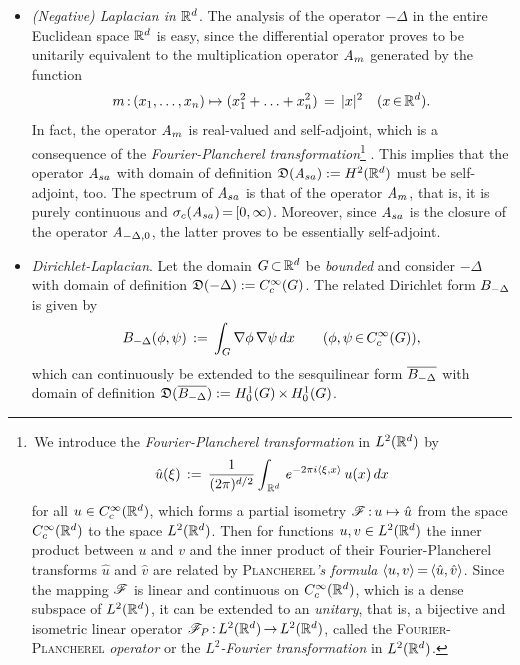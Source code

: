 \documentclass[11pt,twoside]{article}
\def\G{G}
\begin{document}
\begin{itemize}[leftmargin=9mm]
\begin{itemize}[leftmargin=5mm]
\item[(i)]
\textit{(Negative) Laplacian in ${\mathbb{R}}^d$}.
The analysis of the operator $-\Delta$ in the entire Euclidean space ${\mathbb{R}}^d$
is easy,
since the differential operator proves to be unitarily equivalent to
the multiplication operator $\mathit{A}_m$ generated by the function
\[
m \: (x_1,\ldots,x_n) \mapsto (x_1^2 + \ldots + x_n^2) \= \abs{x} ^2
\quad (x \xeof \Rd).
\]
In fact,
the operator $\mathit{A}_m$ is real-valued and self-adjoint,
which is a consequence of
the \textit{Fourier-Plancherel transformation}\footnote{
\,We introduce the \textit{Fourier-Plancherel transformation} in $L^2({\mathbb{R}}^d)$
by 
\[
\hat{u}(\xi) \,:=\,
\frac{1}{(2 \pi)^{d/2}}
\int_{\,{\mathbb{R}}^d} \, e^{-2 \pi i \langle \xi,x \rangle} \, u(x) \, dx
\]
for all $u \in C_c^{\infty}({\mathbb{R}}^d)$,
which forms a partial isometry $\mathscr{F} {\,:\,} u \mapsto \hat{u} $
from the space $C_c^{\infty}({\mathbb{R}}^d)$ to the space $L^2({\mathbb{R}}^d)$.
Then for functions $u,v \in L^2({\mathbb{R}}^d)$ 
the inner product between $u$ and $v$
and the inner product of their Fourier-Plancherel transforms
$\hat{u}$ and $\hat{v}$ are related by \textsc{Plancherel}\textit{'s formula}
$\langle u,v \rangle {\,=\,} \langle  \hat{u} ,\hat{v}  \rangle$.
Since the mapping $\mathscr{F}$ is linear and continuous on $C_c^{\infty}({\mathbb{R}}^d)$,
which is a dense subspace of $L^2({\mathbb{R}}^d)$,
it can be extended to an \textit{unitary},
that is,
a bijective and isometric linear operator
$\mathscr{F}_P {\,:\,} L^2({\mathbb{R}}^d) {\,\to\,} L^2({\mathbb{R}}^d)$,
called the \textsc{Fourier-Plancherel} \textit{operator}
or the \textit{$L^2$-Fourier transformation} in $L^2({\mathbb{R}}^d)$.}
.
This implies
that the operator $\mathit{A}_{sa}$ with domain of definition
$\mathfrak{D}(\mathit{A}_{sa}) := H^2({\mathbb{R}}^d)$ must be self-adjoint,
too.
The spectrum of $\mathit{A}_{sa}$ is that of the operator $\mathit{A}_m$,
that is,
it is purely continuous and $\sigma_c(\mathit{A}_{sa}) {\,=\,} [0,\infty)$.
Moreover,
since $\mathit{A}_{sa}$ is the closure of the operator $\mathit{A}_{-\Delta,0}$,
the latter proves to be essentially self-adjoint.

\item[(ii)]
\textit{Dirichlet-Laplacian}.
Let the domain $\G \xsubset \Rd$ be \textit{bounded}
and consider $-\Delta$ with domain of definition $\domain{-\Delta} := \TF$.
The related Dirichlet form $B_{-\Delta}$ is given by 
\[
\DF_{-\Delta}(\phi,\psi) \eqdef
\int_{\G} \nabla \phi \, \nabla \psi \, dx
\quad \quad
(\phi,\psi \xeof \TF),
\]
which can continuously be extended to the sesquilinear form
$\overline{B_{-\Delta}}$ with domain of definition
$\domain{\overline{\DF_{-\Delta}}} := \HN{1}{\G} \xtimes \HN{1}{\G}$.


\end{itemize}
\end{itemize}
\end{document}

